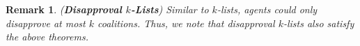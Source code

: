 \documentclass[letterpaper]{article} %
\newtheorem{remark}{Remark}
\begin{document}


\begin{remark}
{\normalfont (\textbf{Disapproval $k$-Lists})} Similar to $k$-lists, agents could only {\normalfont disapprove} at most $k$ coalitions. Thus, we note that {\normalfont disapproval} $k$-lists also satisfy the above theorems. 
\end{remark}
\end{document}
